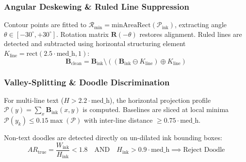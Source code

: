 \documentclass[twocolumn,10pt,a4paper]{article}
\begin{document}
\subsubsection{Angular Deskewing & Ruled Line Suppression}
Contour points are fitted to $\mathcal{R}_{\text{min}} = \text{minAreaRect}(\mathcal{P}_{\text{ink}})$, extracting angle $\theta \in [-30^\circ, +30^\circ]$. Rotation matrix $\mathbf{R}(-\theta)$ restores alignment. Ruled lines are detected and subtracted using horizontal structuring element $K_{\text{line}} = \text{rect}(2.5 \cdot \text{med\_h}, 1)$:
\begin{equation}
\mathbf{B}_{\text{clean}} = \mathbf{B}_{\text{ink}} \setminus ((\mathbf{B}_{\text{ink}} \ominus K_{\text{line}}) \oplus K_{\text{line}})
\end{equation}

\subsubsection{Valley-Splitting & Doodle Discrimination}
For multi-line text ($H > 2.2 \cdot \text{med\_h}$), the horizontal projection profile $\mathcal{P}(y) = \sum_{x} \mathbf{B}_{\text{ink}}(x, y)$ is computed. Baselines are sliced at local minima $\mathcal{P}(y_k) \le 0.15 \max(\mathcal{P})$ with inter-line distance $\ge 0.75 \cdot \text{med\_h}$. 

Non-text doodles are detected directly on un-dilated ink bounding boxes:
\begin{equation}
AR_{\text{true}} = \frac{W_{\text{ink}}}{H_{\text{ink}}} < 1.8 \quad \text{AND} \quad H_{\text{ink}} > 0.9 \cdot \text{med\_h} \implies \text{Reject Doodle}
\end{equation}
\end{document}
